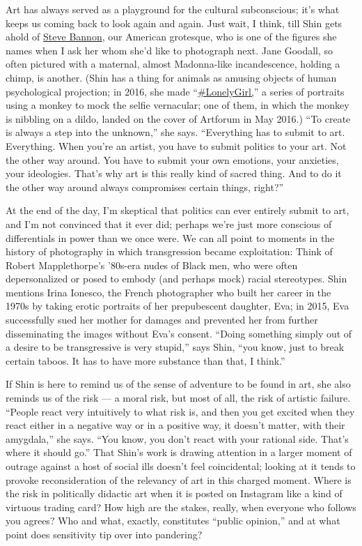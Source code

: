 Art has always served as a playground for the cultural subconscious;
it's what keeps us coming back to look again and again. Just wait, I
think, till Shin gets ahold of
\href{https://www.nytimes3xbfgragh.onion/2020/08/20/nyregion/steve-bannon-arrested-indicted.html}{Steve
Bannon}, our American grotesque, who is one of the figures she names
when I ask her whom she'd like to photograph next. Jane Goodall, so
often pictured with a maternal, almost Madonna-like incandescence,
holding a chimp, is another. (Shin has a thing for animals as amusing
objects of human psychological projection; in 2016, she made
``\href{https://www.galeriebernhard.com/exhibitions/heji-shin-lonelygirl}{\#LonelyGirl,}''
a series of portraits using a monkey to mock the selfie vernacular; one
of them, in which the monkey is nibbling on a dildo, landed on the cover
of Artforum in May 2016.) ``To create is always a step into the
unknown,'' she says. ``Everything has to submit to art. Everything. When
you're an artist, you have to submit politics to your art. Not the other
way around. You have to submit your own emotions, your anxieties, your
ideologies. That's why art is this really kind of sacred thing. And to
do it the other way around always compromises certain things, right?''

At the end of the day, I'm skeptical that politics can ever entirely
submit to art, and I'm not convinced that it ever did; perhaps we're
just more conscious of differentials in power than we once were. We can
all point to moments in the history of photography in which
transgression became exploitation: Think of Robert Mapplethorpe's
'80s-era nudes of Black men, who were often depersonalized or posed to
embody (and perhaps mock) racial stereotypes. Shin mentions Irina
Ionesco, the French photographer who built her career in the 1970s by
taking erotic portraits of her prepubescent daughter, Eva; in 2015, Eva
successfully sued her mother for damages and prevented her from further
disseminating the images without Eva's consent. ``Doing something simply
out of a desire to be transgressive is very stupid,'' says Shin, ``you
know, just to break certain taboos. It has to have more substance than
that, I think.''

If Shin is here to remind us of the sense of adventure to be found in
art, she also reminds us of the risk --- a moral risk, but most of all,
the risk of artistic failure. ``People react very intuitively to what
risk is, and then you get excited when they react either in a negative
way or in a positive way, it doesn't matter, with their amygdala,'' she
says. ``You know, you don't react with your rational side. That's where
it should go.'' That Shin's work is drawing attention in a larger moment
of outrage against a host of social ills doesn't feel coincidental;
looking at it tends to provoke reconsideration of the relevancy of art
in this charged moment. Where is the risk in politically didactic art
when it is posted on Instagram like a kind of virtuous trading card? How
high are the stakes, really, when everyone who follows you agrees? Who
and what, exactly, constitutes ``public opinion,'' and at what point
does sensitivity tip over into pandering?

